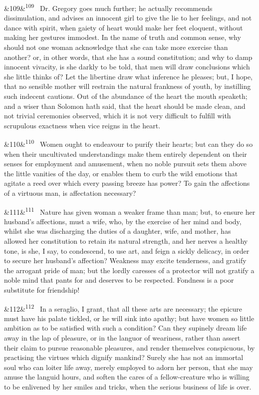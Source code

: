 \documentclass[12pt]{article}
\newcommand{\para}[1][]{\par\noindent\ifx&#1&\else\textsuperscript{\footnotesize #1}~\fi}
\begin{document}
\para[109] Dr. Gregory goes much further; he actually recommends dissimulation, and advises an innocent girl to give the lie to her feelings, and not dance with spirit, when gaiety of heart would make her feet eloquent, without making her gestures immodest. In the name of truth and common sense, why should not one woman acknowledge that she can take more exercise than another? or, in other words, that she has a sound constitution; and why to damp innocent vivacity, is she darkly to be told, that men will draw conclusions which she little thinks of? Let the libertine draw what inference he pleases; but, I hope, that no sensible mother will restrain the natural frankness of youth, by instilling such indecent cautions. Out of the abundance of the heart the mouth speaketh; and a wiser than Solomon hath said, that the heart should be made clean, and not trivial ceremonies observed, which it is not very difficult to fulfill with scrupulous exactness when vice reigns in the heart.

\para[110] Women ought to endeavour to purify their hearts; but can they do so when their uncultivated understandings make them entirely dependent on their senses for employment and amusement, when no noble pursuit sets them above the little vanities of the day, or enables them to curb the wild emotions that agitate a reed over which every passing breeze has power? To gain the affections of a virtuous man, is affectation necessary?

\para[111] Nature has given woman a weaker frame than man; but, to ensure her husband's affections, must a wife, who, by the exercise of her mind and body, whilst she was discharging the duties of a daughter, wife, and mother, has allowed her constitution to retain its natural strength, and her nerves a healthy tone, is she, I say, to condescend, to use art, and feign a sickly delicacy, in order to secure her husband's affection? Weakness may excite tenderness, and gratify the arrogant pride of man; but the lordly caresses of a protector will not gratify a noble mind that pants for and deserves to be respected. Fondness is a poor substitute for friendship!

\para[112] In a seraglio, I grant, that all these arts are necessary; the epicure must have his palate tickled, or he will sink into apathy; but have women so little ambition as to be satisfied with such a condition? Can they supinely dream life away in the lap of pleasure, or in the languor of weariness, rather than assert their claim to pursue reasonable pleasures, and render themselves conspicuous, by practising the virtues which dignify mankind? Surely she has not an immortal soul who can loiter life away, merely employed to adorn her person, that she may amuse the languid hours, and soften the cares of a fellow-creature who is willing to be enlivened by her smiles and tricks, when the serious business of life is over.
\end{document}
